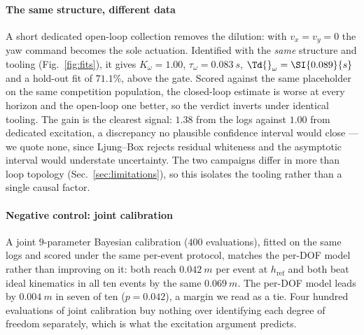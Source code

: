 \paragraph{The same structure, different data}
A short dedicated open-loop collection removes the dilution: with
$v_x = v_y = 0$ the yaw command becomes the sole actuation. Identified with the
\emph{same} structure and tooling (Fig.~\ref{fig:fits}), it gives
$K_\omega = 1.00$, $\tau_\omega = \SI{0.083}{s}$, $\Td{}_\omega = \SI{0.089}{s}$
and a hold-out fit of $71.1\%$, above the gate. Scored against the same
placeholder on the same competition population, the closed-loop estimate is
worse at every horizon and the open-loop one better, so the verdict inverts
under identical tooling. The gain is the clearest signal: $1.38$ from the logs
against $1.00$ from dedicated excitation, a discrepancy no plausible confidence
interval would close --- we quote none, since Ljung--Box rejects residual
whiteness and the asymptotic interval would understate uncertainty. The two
campaigns differ in more than loop topology
(Sec.~\ref{sec:limitations}), so this isolates the tooling rather than a single
causal factor.

\paragraph{Negative control: joint calibration}
\label{sec:results:bayesopt}
A joint $9$-parameter Bayesian calibration ($400$ evaluations), fitted on the
same logs and scored under the same per-event protocol, matches the per-DOF
model rather than improving on it: both reach $\SI{0.042}{m}$ per event at
$h_{\mathrm{ref}}$ and both beat ideal kinematics in all ten events by the same
$\SI{0.069}{m}$. The per-DOF model leads by $\SI{0.004}{m}$ in seven of ten
($p = 0.042$), a margin we read as a tie. Four hundred evaluations of joint
calibration buy nothing over identifying each degree of freedom separately,
which is what the excitation argument predicts.
